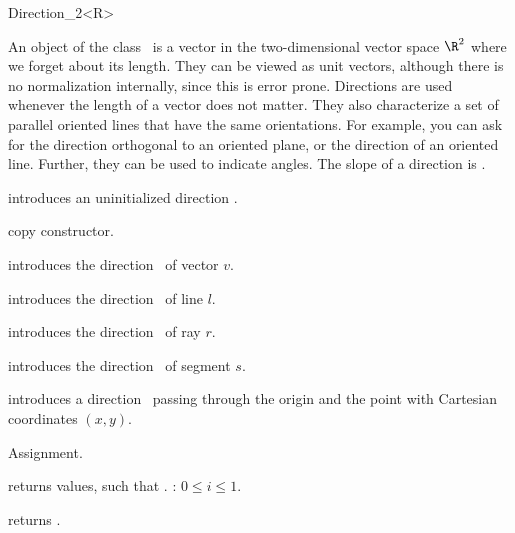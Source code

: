 \begin{ccRefClass} {Direction_2<R>}

\ccDefinition
An object of the class \ccRefName\ is a vector in the two-dimensional 
vector space $\R^2$  where we forget about its length. They can be
viewed as unit vectors, although there is no normalization internally,
since this is error prone.  Directions are used whenever the length of
a vector does not matter. 
They also characterize a set of parallel oriented lines that have the same
orientations.  
For example, you can ask for the direction
orthogonal to an oriented plane, or the direction of an oriented line.
Further, they can be used to indicate angles. The slope of a direction
is .


\ccCreation
{}


\ccHidden {}
             {introduces an uninitialized direction \ccVar.}

\ccHidden {}
            {copy constructor.}

            {introduces the direction \ccVar\ of vector $v$.}

            {introduces the direction \ccVar\ of line $l$.}

            {introduces the direction \ccVar\ of ray $r$.}

            {introduces the direction \ccVar\ of segment $s$.}

            {introduces a direction \ccVar\ passing through the origin
             and the point with Cartesian coordinates $(x, y)$.}


\ccOperations

\ccHidden {}
        {Assignment.}

       {returns values, such that \ccVar {}.
        \ccPrecond: $0 \leq i \leq 1$.}

       {returns .}


\end{ccRefClass}
